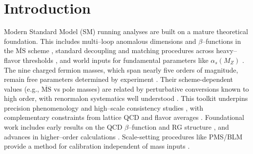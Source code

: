\documentclass[aps,prd,onecolumn,amsmath,amssymb,superscriptaddress,nofootinbib,showpacs,showkeys]{revtex4-2}
\begin{document}

\maketitle







\section{Introduction}

Modern Standard Model (SM) running analyses are built on a mature theoretical foundation. This includes multi–loop anomalous dimensions and $\beta$–functions in the $\overline{\mathrm{MS}}$ scheme \cite{VermaserenLarinRitbergen97,vanRitbergenVermaserenLarin97,MachacekVaughn83,LuoWangXiao2003,Mihaila2012,ChetyrkinZoller2012,Bednyakov2013,VermaserenWeinzierl2008}, standard decoupling and matching procedures across heavy–flavor thresholds \cite{CKS1998,SchroederSteinhauser2006,ChetyrkinKniehlSteinhauser2006,RunDec3}, and world inputs for fundamental parameters like $\alpha_s(M_Z)$ \cite{PDG2023,Bethke2013,PDGAlphaS,Davier2020,Keshavarzi2019}. The nine charged fermion masses, which span nearly five orders of magnitude, remain free parameters determined by experiment \cite{PDG2023}. Their scheme-dependent values (e.g., $\overline{\mathrm{MS}}$ vs pole masses) are related by perturbative conversions known to high order, with renormalon systematics well understood \cite{Tarrach1981,Gray1990,MelnikovvanRitbergen2000,Marquard2015,Beneke1999,Hoang2017,BenekeTopMass2017}. This toolkit underpins precision phenomenology and high–scale consistency studies \cite{Degrassi2012,Buttazzo2013,Buttazzo2023,Kitahara2020}, with complementary constraints from lattice QCD and flavor averages \cite{FLAG2021,HFLAV2022,Davies2019,Dehnadi2015,Boito2023}. Foundational work includes early results on the QCD $\beta$–function \cite{Tarasov1980,Caswell1974,Jones1974} and RG structure \cite{CollinsRenorm}, and advances in higher–order calculations \cite{ChetyrkinRetey2000,BaikovChetyrkinKuehn2014,ChetyrkinKuhnSteinhauser2000,Chetyrkin2000Decoupling}. Scale-setting procedures like PMS/BLM provide a method for calibration independent of mass inputs \cite{Stevenson81,BLM83,Grunberg1984,BrodskyLu1995}.
\end{document}
